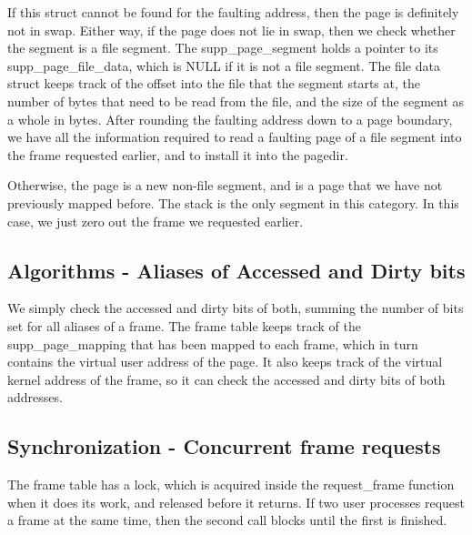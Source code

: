 If this struct cannot be found for the faulting address, then the page is
definitely not in swap. Either way, if the page does not lie in swap, then we
check whether the segment is a file segment. The supp\_page\_segment holds a
pointer to its supp\_page\_file\_data, which is NULL if it is not a file
segment. The file data struct keeps track of the offset into the file that the
segment starts at, the number of bytes that need to be read from the file, and
the size of the segment as a whole in bytes. After rounding the faulting address
down to a page boundary, we have all the information required to read a faulting
page of a file segment into the frame requested earlier, and to install it into
the pagedir.

Otherwise, the page is a new non-file segment, and is a page that we have not
previously mapped before. The stack is the only segment in this category.  In
this case, we just zero out the frame we requested earlier.

\subsection{Algorithms - Aliases of Accessed and Dirty bits}


We simply check the accessed and dirty bits of both, summing the number of bits
set for all aliases of a frame. The frame table keeps track of the
supp\_page\_mapping that has been mapped to each frame, which in turn contains
the virtual user address of the page. It also keeps track of the virtual kernel
address of the frame, so it can check the accessed and dirty bits of both
addresses.

\subsection{Synchronization - Concurrent frame requests}


The frame table has a lock, which is acquired inside the request\_frame
function when it does its work, and released before it returns. If two user
processes request a frame at the same time, then the second call blocks
until the first is finished.

